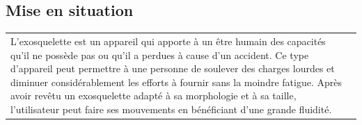 \documentclass[10pt,fleqn]{article} %
\begin{document}

\vspace{4.5cm}
\pagestyle{fancy}
\thispagestyle{plain}


\def\columnseprulecolor{\color{ocre}}
\setlength{\columnseprule}{0.4pt} 


\begin{multicols}{2}
\section*{Mise en situation}
\ifprof
\else

\noindent
\begin{tabular}{m{.6\linewidth}m{.3\linewidth}}
L’exosquelette est un appareil qui apporte à un être humain des capacités qu’il ne possède pas ou qu’il a perdues à cause d’un accident. Ce type d’appareil peut permettre à une personne de soulever des charges lourdes et diminuer considérablement les efforts à fournir sans la moindre fatigue. Après avoir revêtu un exosquelette adapté à sa morphologie et à sa taille, l’utilisateur peut faire ses mouvements en bénéficiant
d’une grande fluidité.
& 

\end{tabular}
\end{multicols}
\end{document}
